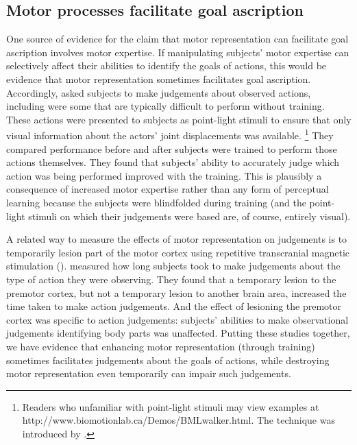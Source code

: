 \documentclass[12pt,\papersize]{extarticle}
\begin{document}
\subsection{Motor processes facilitate goal ascription}
One source of evidence for the claim that motor representation can facilitate goal ascription involves motor expertise. 
If manipulating subjects' motor expertise can selectively affect their abilities to identify the goals of actions, this would be evidence that motor representation sometimes facilitates goal ascription.  Accordingly, \citet{casile:2006_nonvisual} asked subjects to make judgements about observed actions, including were some that are typically difficult to perform without training.  These actions were presented to subjects as point-light stimuli to ensure that only visual information about the actors' joint displacements was available.%
\footnote{
Readers who unfamiliar with point-light stimuli may view examples at http://www.biomotionlab.ca/Demos/BMLwalker.html.
The technique was introduced by \citet{johansson:1973_visual}.
}
They compared performance before and after subjects were trained to perform those actions themselves. They found that subjects' ability to accurately judge which action was being performed improved with the training. This is plausibly a consequence of increased motor expertise rather than any form of perceptual learning because the subjects were blindfolded during training (and the point-light stimuli on which their judgements were based are, of course, entirely visual). 

A related way to measure the effects of motor representation on judgements is to temporarily lesion part of the motor cortex using repetitive transcranial magnetic stimulation  (\citealp{urgesi:2007_representation, moro:2008_neural}).  \citet{urgesi:2007_representation} measured how long subjects took to make judgements about the type of action they were observing. They found that a temporary lesion to the premotor cortex, but not a temporary lesion to another brain area, increased the time taken to make action judgements. And the effect of lesioning the premotor cortex was specific to action judgements: subjects' abilities to make observational judgements identifying body parts was unaffected. Putting these studies together, we have evidence that enhancing motor representation (through training) sometimes facilitates judgements about the goals of actions, while destroying motor representation even temporarily can impair such judgements.
\end{document}
